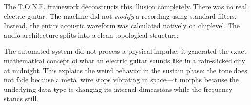 \documentclass[11pt,a4paper]{article}
\begin{document}
The T.O.N.E. framework deconstructs this illusion completely. There was no real electric guitar. The machine did not \textit{modify} a recording using standard filters. Instead, the entire acoustic waveform was calculated natively on chiplevel. The audio architecture splits into a clean topological structure:


\begin{center}
\nopagebreak
{}
\makeatletter
\def\@captype{figure}
\makeatother
\caption{Vector Layout of the Hybrid Inversion Stream}
\end{center}



The automated system did not process a physical impulse; it generated the exact mathematical concept of what an electric guitar sounds like in a rain-slicked city at midnight. This explains the weird behavior in the sustain phase: the tone does not fade because a metal wire stops vibrating in space—it morphs because the underlying data type is changing its internal dimensions while the frequency stands still.
\end{document}
